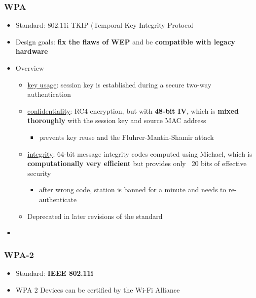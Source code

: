 \documentclass[final]{article}
\begin{document}
\subsubsection*{WPA}
\begin{itemize}[nosep]
    \item Standard: 802.11i TKIP (Temporal Key Integrity Protocol
    \item Design goals: \textbf{fix the flaws of WEP} and be \textbf{compatible with legacy hardware}
    \item Overview
          \begin{itemize}
              \item \underline{key usage}: session key is established during a secure two-way authentication
              \item \underline{confidentiality}: RC4 encryption, but with \textbf{48-bit IV}, which is \textbf{mixed thoroughly} with the session key and source MAC address
                    \begin{itemize}[nosep]
                        \item prevents key reuse and the Fluhrer-Mantin-Shamir attack
                    \end{itemize}
              \item \underline{integrity}: 64-bit message integrity codes computed using Michael, which is \textbf{computationally very efficient} but provides only ~20 bits of effective security
                    \begin{itemize}[nosep]
                        \item after wrong code, station is banned for a minute and needs to re-authenticate
                    \end{itemize}
              \item Deprecated in later revisions of the standard
          \end{itemize}
\end{itemize}
\begin{itemize}
    \item
\end{itemize}
\subsubsection*{WPA-2}
\begin{itemize}[nosep]
    \item Standard: \textbf{IEEE 802.11i}
    \item WPA 2 Devices can be certified by the Wi-Fi Alliance
\end{itemize}
\end{document}

